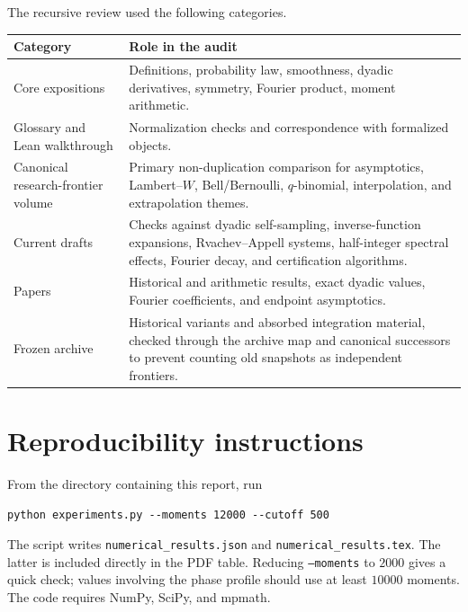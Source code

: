 \documentclass[11pt,oneside]{article}
\theoremstyle{definition}
\begin{document}
The recursive review used the following categories.
\begin{longtable}{@{}p{}p{}@{}}
\toprule
Category&Role in the audit\\
\midrule
Core expositions&Definitions, probability law, smoothness, dyadic derivatives, symmetry,
Fourier product, moment arithmetic.\\
Glossary and Lean walkthrough&Normalization checks and correspondence with formalized
objects.\\
Canonical research-frontier volume&Primary non-duplication comparison for asymptotics,
Lambert--\(W\), Bell/Bernoulli, \(q\)-binomial, interpolation, and extrapolation themes.\\
Current drafts&Checks against dyadic self-sampling, inverse-function expansions,
Rvachev--Appell systems, half-integer spectral effects, Fourier decay, and certification
algorithms.\\
Papers&Historical and arithmetic results, exact dyadic values, Fourier coefficients, and
endpoint asymptotics.\\
Frozen archive&Historical variants and absorbed integration material, checked through the
archive map and canonical successors to prevent counting old snapshots as independent
frontiers.\\
\bottomrule
\end{longtable}

\section{Reproducibility instructions}

From the directory containing this report, run
\begin{verbatim}
python experiments.py --moments 12000 --cutoff 500
\end{verbatim}
The script writes \texttt{numerical\_results.json} and
\texttt{numerical\_results.tex}.  The latter is included directly in the PDF table.
Reducing \texttt{--moments} to \(2000\) gives a quick check; values involving the
phase profile should use at least \(10000\) moments.  The code requires NumPy, SciPy,
and mpmath.
\end{document}
